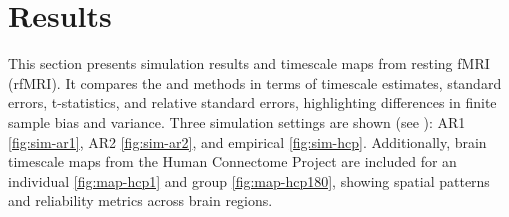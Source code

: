\documentclass[latex/main.tex]{subfiles}
\begin{document}
\section{Results}

This section presents simulation results and timescale maps from resting fMRI (rfMRI). It compares the  and  methods in terms of timescale estimates, standard errors, t-statistics, and relative standard errors, highlighting differences in finite sample bias and variance. Three simulation settings are shown (see ): AR1 \ref{fig:sim-ar1}, AR2 \ref{fig:sim-ar2}, and empirical \ref{fig:sim-hcp}. Additionally, brain timescale maps from the Human Connectome Project are included for an individual \ref{fig:map-hcp1} and group \ref{fig:map-hcp180}, showing spatial patterns and reliability metrics across brain regions.
\end{document}
